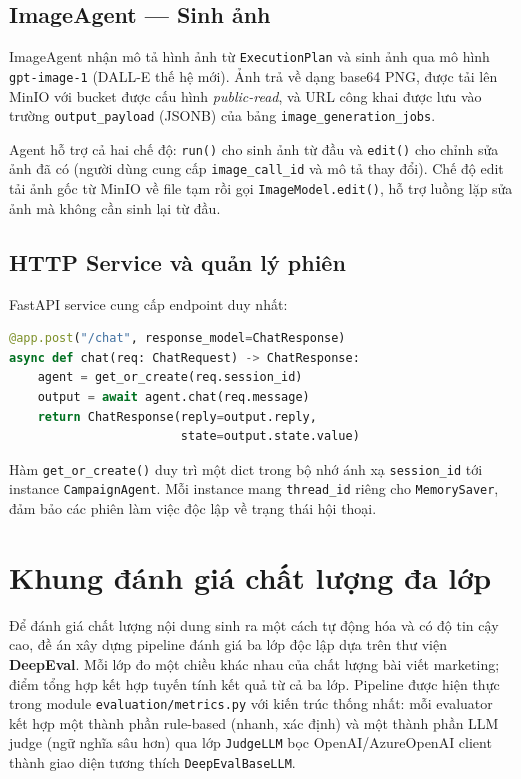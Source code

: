 \subsection{ImageAgent --- Sinh ảnh}

ImageAgent nhận mô tả hình ảnh từ \texttt{ExecutionPlan} và sinh ảnh
qua mô hình \texttt{gpt-image-1} (DALL-E thế hệ mới). Ảnh trả về dạng
base64 PNG, được tải lên MinIO với bucket được cấu hình \emph{public-read},
và URL công khai được lưu vào trường \texttt{output\_payload} (JSONB) của
bảng \texttt{image\_generation\_jobs}.

Agent hỗ trợ cả hai chế độ: \texttt{run()} cho sinh ảnh từ đầu và
\texttt{edit()} cho chỉnh sửa ảnh đã có (người dùng cung cấp \texttt{image\_call\_id}
và mô tả thay đổi). Chế độ edit tải ảnh gốc từ MinIO về file tạm rồi
gọi \texttt{ImageModel.edit()}, hỗ trợ luồng lặp sửa ảnh mà không cần
sinh lại từ đầu.

\subsection{HTTP Service và quản lý phiên}

FastAPI service cung cấp endpoint duy nhất:

\begin{lstlisting}[language=Python, caption={Endpoint POST /chat của FastAPI service.}]
@app.post("/chat", response_model=ChatResponse)
async def chat(req: ChatRequest) -> ChatResponse:
    agent = get_or_create(req.session_id)
    output = await agent.chat(req.message)
    return ChatResponse(reply=output.reply,
                        state=output.state.value)
\end{lstlisting}

Hàm \texttt{get\_or\_create()} duy trì một dict trong bộ nhớ ánh xạ
\texttt{session\_id} tới instance \texttt{CampaignAgent}. Mỗi instance
mang \texttt{thread\_id} riêng cho \texttt{MemorySaver}, đảm bảo các
phiên làm việc độc lập về trạng thái hội thoại.

\section{Khung đánh giá chất lượng đa lớp}\label{sec:pipeline-danh-gia}

Để đánh giá chất lượng nội dung sinh ra một cách tự động hóa và có độ
tin cậy cao, đề án xây dựng pipeline đánh giá ba lớp độc lập dựa
trên thư viện \textbf{DeepEval}. Mỗi lớp đo một chiều khác nhau của
chất lượng bài viết marketing; điểm tổng hợp kết hợp tuyến tính kết
quả từ cả ba lớp. Pipeline được hiện thực trong module
\texttt{evaluation/metrics.py} với kiến trúc thống nhất: mỗi
evaluator kết hợp một thành phần rule-based (nhanh, xác định) và một
thành phần LLM judge (ngữ nghĩa sâu hơn) qua lớp \texttt{JudgeLLM}
bọc OpenAI/AzureOpenAI client thành giao diện tương thích
\texttt{DeepEvalBaseLLM}.

